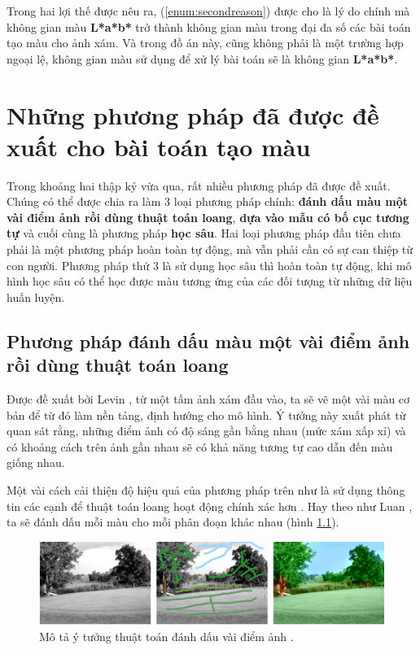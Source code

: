 \documentclass[a4paper, 12pt]{report}
\begin{document}
Trong hai lợi thế được nêu ra, (\ref{enum:secondreason}) được cho là lý do chính mà không gian màu \textbf{L*a*b*} trở thành không gian màu trong đại đa số các bài toán tạo màu cho ảnh xám.
Và trong đồ án này, cũng không phải là một trường hợp ngoại lệ, không gian màu sử dụng để xử lý bài toán sẽ là không gian \textbf{L*a*b*}.

\chapter{Những phương pháp đã được đề xuất cho bài toán tạo màu}\label{proposedmethods}

Trong khoảng hai thập kỷ vừa qua, rất nhiều phương pháp đã được đề xuất.
Chúng có thể được chia ra làm 3 loại phương pháp chính: \textbf{đánh dấu màu một vài điểm ảnh rồi dùng thuật toán loang}, \textbf{dựa vào mẫu có bố cục tương tự} và cuối cùng là phương pháp \textbf{học sâu}.
Hai loại phương pháp đầu tiên chưa phải là một phương pháp hoàn toàn tự động, mà vẫn phải cần có sự can thiệp từ con người.
Phương pháp thứ 3 là sử dụng học sâu thì hoàn toàn tự động, khi mô hình học sâu có thể học được màu tương ứng của các đối tượng từ những dữ liệu huấn luyện.

\section{Phương pháp đánh dấu màu một vài điểm ảnh rồi dùng thuật toán loang}\label{scribblemethods}

Được đề xuất bởi Levin \cite{alevincolorization}, từ một tấm ảnh xám đầu vào, ta sẽ vẽ một vài màu cơ bản để từ đó làm nền tảng, định hướng cho mô hình.
Ý tưởng này xuất phát từ quan sát rằng, những điểm ảnh có độ sáng gần bằng nhau (mức xám xấp xỉ) và có khoảng cách trên ảnh gần nhau sẽ có khả năng tương tự cao dẫn đến màu giống nhau.\vspace{5pt}

Một vài cách cải thiện độ hiệu quả của phương pháp trên như là sử dụng thông tin các cạnh để thuật toán loang hoạt động chính xác hơn \cite{huangcolorization}.
Hay theo như Luan \cite{luancolorization}, ta sẽ đánh dấu mỗi màu cho mỗi phân đoạn khác nhau (hình \ref{fig:scribblemethod}). 

\begin{figure}[!h]
\captionsetup{width=0.8\textwidth}
\centering
\includegraphics[width=15cm]{images/2_4.png}
\caption{Mô tả ý tưởng thuật toán đánh dấu vài điểm ảnh \cite{trungcolorization2018}.}
\label{fig:scribblemethod}
\end{figure}
\end{document}
